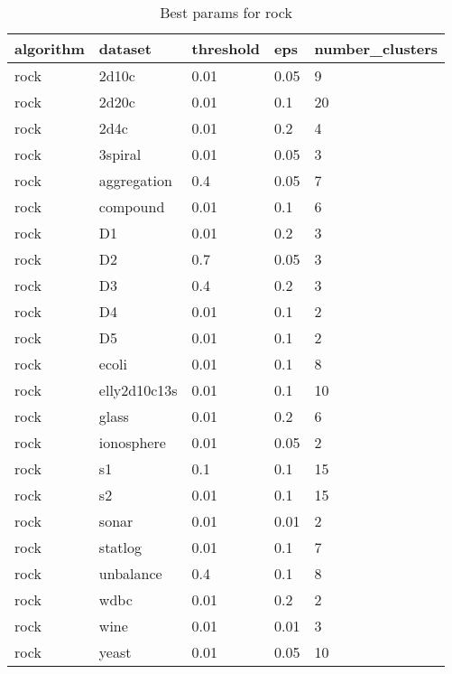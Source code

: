 \clearpage

\begin{table}[H]
\centering
\caption{Best params for rock}
\label{S40_Table}
\begin{tabular}{|l|l|l|l|l|}
\hline
algorithm & dataset & threshold & eps & number\_clusters \\
\hline
rock & 2d10c & 0.01 & 0.05 & 9 \\
\hline
rock & 2d20c & 0.01 & 0.1 & 20 \\
\hline
rock & 2d4c & 0.01 & 0.2 & 4 \\
\hline
rock & 3spiral & 0.01 & 0.05 & 3 \\
\hline
rock & aggregation & 0.4 & 0.05 & 7 \\
\hline
rock & compound & 0.01 & 0.1 & 6 \\
\hline
rock & D1 & 0.01 & 0.2 & 3 \\
\hline
rock & D2 & 0.7 & 0.05 & 3 \\
\hline
rock & D3 & 0.4 & 0.2 & 3 \\
\hline
rock & D4 & 0.01 & 0.1 & 2 \\
\hline
rock & D5 & 0.01 & 0.1 & 2 \\
\hline
rock & ecoli & 0.01 & 0.1 & 8 \\
\hline
rock & elly2d10c13s & 0.01 & 0.1 & 10 \\
\hline
rock & glass & 0.01 & 0.2 & 6 \\
\hline
rock & ionosphere & 0.01 & 0.05 & 2 \\
\hline
rock & s1 & 0.1 & 0.1 & 15 \\
\hline
rock & s2 & 0.01 & 0.1 & 15 \\
\hline
rock & sonar & 0.01 & 0.01 & 2 \\
\hline
rock & statlog & 0.01 & 0.1 & 7 \\
\hline
rock & unbalance & 0.4 & 0.1 & 8 \\
\hline
rock & wdbc & 0.01 & 0.2 & 2 \\
\hline
rock & wine & 0.01 & 0.01 & 3 \\
\hline
rock & yeast & 0.01 & 0.05 & 10 \\
\hline
\end{tabular}
\end{table}

\clearpage

